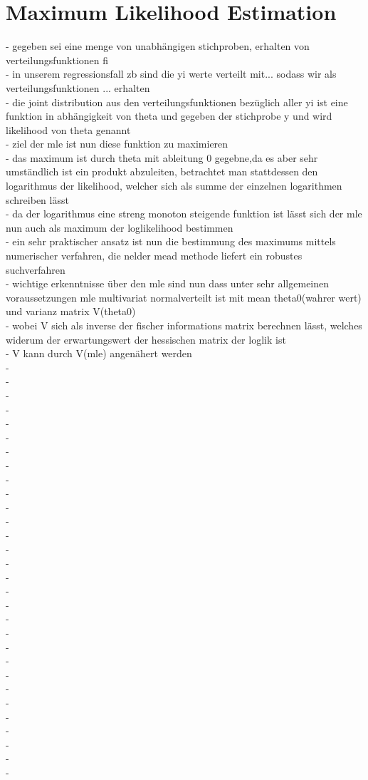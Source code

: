 \section{Maximum Likelihood Estimation}
- gegeben sei eine menge von unabhängigen stichproben, erhalten von verteilungsfunktionen fi\\
- in unserem regressionsfall zb sind die yi werte verteilt mit... sodass wir als verteilungsfunktionen ... erhalten\\
- die joint distribution aus den verteilungsfunktionen bezüglich aller yi ist eine funktion in abhängigkeit von theta und gegeben der stichprobe y und wird likelihood von theta genannt\\
- ziel der mle ist nun diese funktion zu maximieren\\
- das maximum ist durch theta mit ableitung 0 gegebne,da es aber sehr umständlich ist ein produkt abzuleiten, betrachtet man stattdessen den logarithmus der likelihood, welcher sich als summe der einzelnen logarithmen schreiben lässt\\
- da der logarithmus eine streng monoton steigende funktion ist lässt sich der mle nun auch als maximum der loglikelihood bestimmen\\
- ein sehr praktischer ansatz ist nun die bestimmung des maximums mittels numerischer verfahren, die nelder mead methode liefert ein robustes suchverfahren\\
- wichtige erkenntnisse über den mle sind nun dass unter sehr allgemeinen voraussetzungen mle multivariat normalverteilt ist mit mean theta0(wahrer wert) und varianz matrix V(theta0)\\
- wobei V sich als inverse der fischer informations matrix berechnen lässt, welches widerum der erwartungswert der hessischen matrix der loglik ist\\
- V kann durch V(mle) angenähert werden\\
- \\
- \\
- \\
- \\
- \\
- \\
- \\
- \\
- \\
- \\
- \\
- \\
- \\
- \\
- \\
- \\
- \\
- \\
- \\
- \\
- \\
- \\
- \\
- \\
- \\
- \\
- \\
- \\
- \\
- \\


